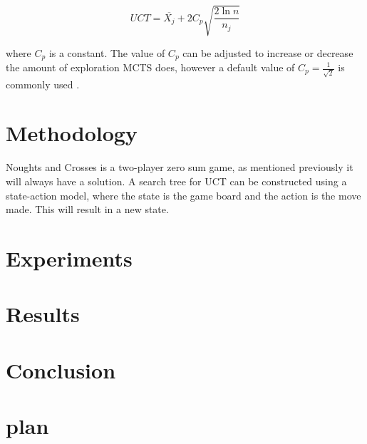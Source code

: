 \[UCT = \overline{X_{j}} +2C_{p}\sqrt{\frac{2 \ln n}{n_{j}}}\]

where $C_{p}$ is a constant. The value of $C_{p}$ can be adjusted to increase or decrease the amount of exploration MCTS does, however a default value of $C_{p} = \frac{1}{\sqrt{2}}$ is commonly used \cite{b2}.




\section{Methodology}
Noughts and Crosses is a two-player zero sum game, as mentioned previously it will always have a solution. A search tree for UCT can be constructed using a state-action model, where the state is the game board and the action is the move made. This will result in a new state. 

\section{Experiments}
\section{Results}
\section{Conclusion}
\section{plan}

